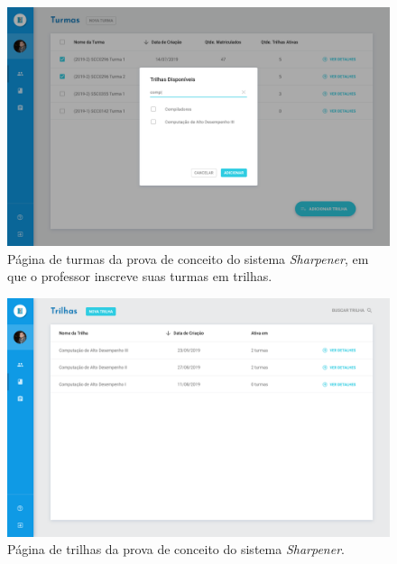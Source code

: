   \begin{figure}[htpb]
    \centering
    \includegraphics[width=\linewidth]{images/mocks/turmaAddTrackSearch.png}
    \caption{Página de turmas da prova de conceito do sistema \emph{Sharpener}, em 
	    que o professor inscreve suas turmas em trilhas.}%
    \label{fig:enroll_track}
  \end{figure}

  \begin{figure}[htpb]
  \centering
  \includegraphics[width=\linewidth]{images/mocks/track.png}
  \caption{Página de trilhas da prova de conceito do sistema \emph{Sharpener}.}%
  \label{fig:track}
  \end{figure}

